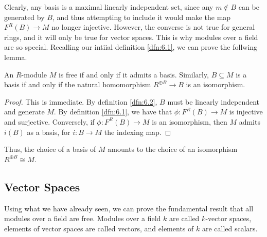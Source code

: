 Clearly, any basis is a maximal linearly independent set, since any $m\notin B$ can be generated by $B$, and thus attempting to include it would make the map $F^R(B)\to M$ no longer injective. However, the converse is not true for general rings, and it will only be true for vector spaces. This is why modules over a field are so special. Recalling our intiial definition \ref{dfn:6.1}, we can prove the follwing lemma.
\begin{lemma}\label{lma:6.2}
	An $R$-module $M$ is free if and only if it admits a basis. Similarly, $B\subseteq M$ is a basis if and only if the natural homomorphism $R^{\oplus B} \to B$ is an isomorphism.
\end{lemma}
\begin{proof}
	This is immediate. By definition \ref{dfn:6.2}, $B$ must be linearly independent and generate $M$. By definition \ref{dfn:6.1}, we have that $\phi : F^R(B) \to M$ is injective and surjective. Conversely, if $\phi : F^R(B) \to M$ is an isomorphism, then $M$ admits $i(B)$ as a basis, for $i : B \to M$ the indexing map.
\end{proof}

Thus, the choice of a basis of $M$ amounts to the choice of an isomorphism $R^{\oplus B} \cong M$.

\subsection{Vector Spaces}
Using what we have already seen, we can prove the fundamental result that all modules over a field are free. Modules over a field $k$ are called $k$-vector spaces, elements of vector spaces are called vectors, and elements of $k$ are called scalars.

